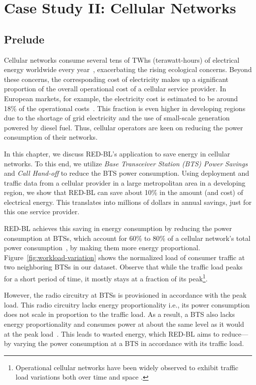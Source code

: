 \chapter{Case Study II: Cellular Networks}
\label{chap:casestudy2}
\section{Prelude}
Cellular networks consume several tens of TWhs (terawatt-hours) of electrical energy worldwide every year~\cite{Oh:Comm:2011}, exacerbating the rising ecological concerns. Beyond these concerns, the corresponding cost of electricity makes up a significant proportion of the overall operational cost of a cellular service provider.
In European markets, for example, the electricity cost is
estimated to be around 18\% of the operational costs~\cite{Blume:2010:BLTJ:CellularPower}.
This fraction is even higher in developing regions due to the shortage of grid electricity and the use of small-scale generation powered by diesel fuel. Thus, cellular operators are keen on reducing the power consumption of their networks.

In this chapter, we discuss RED-BL's application to save energy in cellular networks. To this end, we utilize \textit{Base
Transceiver Station (BTS) Power Savings} and \textit{Call
Hand-off} to reduce the BTS power consumption. Using deployment
and traffic data from a cellular provider in a large metropolitan area in a developing region, we show that
RED-BL can save about 10\% in the amount (and cost) of electrical energy.
This translates into millions of dollars in annual savings, just for this one service provider.


RED-BL achieves this saving in energy consumption by reducing the power consumption at BTSs, which account for 60\% to 80\% of a cellular network's total power consumption~\cite{Oh:Comm:2011,Louhi:2007:BTSPower:INTELEC,Peng:2011:BTSSaving:Mobicom}, by making them more energy proportional.
Figure~\ref{fig:workload-variation} shows the normalized load of consumer traffic at two neighboring BTSs in our dataset.
Observe that while the traffic load peaks for a short period of time, it mostly stays at a fraction of its peak\footnote{Operational cellular networks have been widely observed to exhibit traffic load variations both over time and space \cite{Peng:2011:BTSSaving:Mobicom}.}.

However, the radio circuitry at BTSs is provisioned in accordance with the peak load.
This radio circuitry lacks energy proportionality i.e., its power consumption does not scale in proportion to the traffic load.
As a result, a BTS also lacks energy proportionality and consumes power at about the same level as it would at the peak load~\cite{Peng:2011:BTSSaving:Mobicom}. This leads to wasted energy, which RED-BL aims to reduce---by varying the power consumption at a BTS in accordance with its traffic load.

